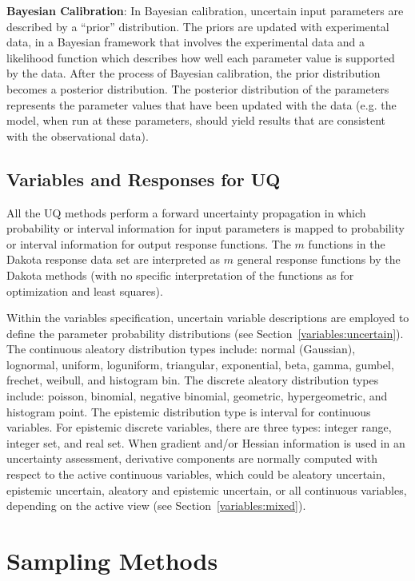 \textbf{Bayesian Calibration}:  In Bayesian calibration, uncertain 
input parameters are described by a ``prior'' distribution. The priors
are updated with experimental data, in a Bayesian framework that 
involves the experimental data and a likelihood function which describes 
how well each parameter value is supported by the data. After the process
of Bayesian calibration, the prior distribution becomes a posterior 
distribution. The posterior distribution of the parameters represents
the parameter values that have been updated with the data (e.g. the 
model, when run at these parameters, should yield results that are 
consistent with the observational data). 
 

\subsection{Variables and Responses for UQ}\label{uq:overview:varsresp}

All the UQ methods perform a forward uncertainty propagation in which
probability or interval information for input parameters is mapped to
probability or interval information for output response functions. The
$m$ functions in the Dakota response data set are interpreted as $m$
general response functions by the Dakota methods (with no specific
interpretation of the functions as for optimization and least
squares).

Within the variables specification, uncertain variable descriptions
are employed to define the parameter probability distributions (see
Section~\ref{variables:uncertain}). The continuous aleatory
distribution types include: normal (Gaussian), lognormal, uniform,
loguniform, triangular, exponential, beta, gamma, gumbel, frechet,
weibull, and histogram bin. The discrete aleatory distribution types
include: poisson, binomial, negative binomial, geometric,
hypergeometric, and histogram point. The epistemic distribution type
is interval for continuous variables. For epistemic discrete
variables, there are three types: integer range, integer set, and real
set.  When gradient and/or Hessian information is used in an
uncertainty assessment, derivative components are normally computed
with respect to the active continuous variables, which could be
aleatory uncertain, epistemic uncertain, aleatory and epistemic
uncertain, or all continuous variables, depending on the active view
(see Section~\ref{variables:mixed}).

\section{Sampling Methods}\label{uq:sampling}

